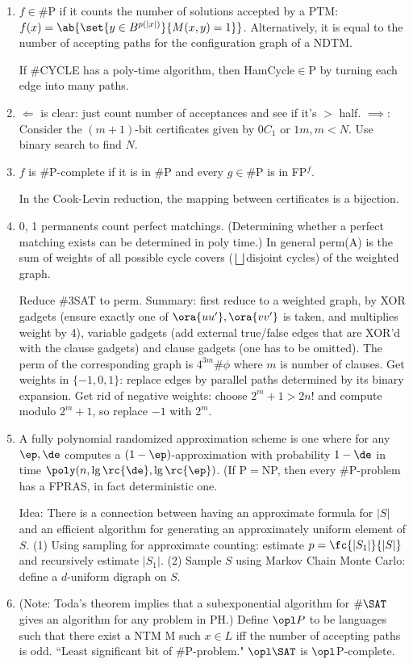 \begin{enumerate}
\item
$f\in$\#P if it counts the number of solutions accepted by a PTM: $f(x)=\ab{\set{y\in B^{p(|x|)}}{M(x,y)=1}}$. Alternatively, it is equal to the number of accepting paths for the configuration graph of a NDTM.

If \#CYCLE has a poly-time algorithm, then HamCycle$\in$P by turning each edge into many paths.
\item $\Leftarrow$ is clear: just count number of acceptances and see if it's $>$ half. $\implies$: Consider the $(m+1)$-bit certificates given by $0C_1$ or $1m,m<N$. Use binary search to find $N$.
\item
$f$ is \#P-complete if it is in \#P and every $g\in $\#P is in FP${}^f$.

In the Cook-Levin reduction, the mapping between certificates is a bijection.
\item
0, 1 permanents count perfect matchings. (Determining whether a perfect matching exists can be determined in poly time.) In general perm(A) is the sum of weights of all possible cycle covers ($\bigsqcup$disjoint cycles) of the weighted graph.

Reduce \#3SAT to perm. Summary: first reduce to a weighted graph, by XOR gadgets (ensure exactly one of $\ora{uu'},\ora{vv'}$ is taken, and multiplies weight by 4), variable gadgets (add external true/false edges that are XOR'd with the clause gadgets) and clause gadgets (one has to be omitted). The perm of the corresponding graph is $4^{3m}\#\phi$ where $m$ is number of clauses. Get weights in $\{-1,0,1\}$: replace edges by parallel paths determined by its binary expansion. Get rid of negative weights: choose $2^m+1>2n!$ and compute modulo $2^m+1$, so replace $-1$ with $2^m$.
\item A fully polynomial randomized approximation scheme is one where for any $\ep,\de$ computes a $(1-\ep)$-approximation with probability $1-\de$ in time $\poly(n,\lg \rc{\de},\lg \rc{\ep})$. (If P$=$NP, then every \#P-problem has a FPRAS, in fact deterministic one.

Idea: There is a connection between having an approximate formula for $|S|$ and an efficient algorithm for generating an approximately uniform element of $S$.  (1) Using sampling for approximate counting: estimate $p=\fc{|S_1|}{|S|}$ and recursively estimate $|S_1|$. (2) Sample $S$ using Markov Chain Monte Carlo: define a $d$-uniform digraph on $S$.
\item (Note: Toda's theorem implies that a subexponential algorithm for $\#\SAT$ gives an algorithm for any problem in PH.) Define $\opl P$ to be languages such that there exist a NTM M such $x\in L$ iff the number of accepting paths is odd. ``Least significant bit of $\#$P-problem." $\opl \SAT$ is $\opl $P-complete.


\end{enumerate}

